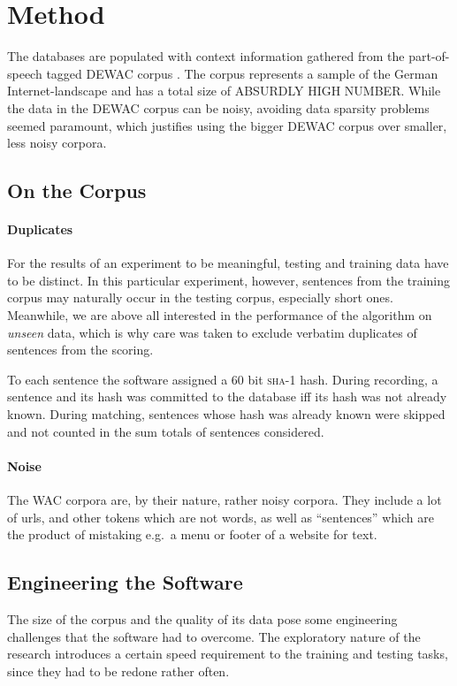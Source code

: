 \documentclass[12pt]{article}
\begin{document}
\section{Method}

The databases are populated with context information gathered from the
part-of-speech tagged DEWAC corpus \citep{baroniETAL2008}. The corpus represents
a sample of the German Internet-landscape and has a total size of ABSURDLY HIGH
NUMBER. %
While the data in the DEWAC corpus can be noisy, avoiding data sparsity
problems seemed paramount, which justifies using the bigger DEWAC
corpus over smaller, less noisy corpora.

\subsection{On the Corpus}

\paragraph{Duplicates} For the results of an experiment to be meaningful,
testing and training data have to be distinct. In this particular experiment,
however, sentences from the training corpus may naturally occur in the testing
corpus, especially short ones. %
Meanwhile, we are above all interested in the performance of
the algorithm on \emph{unseen} data, which is why care was taken to exclude
verbatim duplicates of sentences from the scoring.

To each sentence the software assigned a 60 bit \textsc{sha-1} hash. During
recording, a sentence and its hash was committed to the database iff its hash
was not already known. During matching, sentences whose hash was already known
were skipped and not counted in the sum totals of sentences considered.

\paragraph{Noise} The WAC corpora are, by their nature, rather noisy corpora.
They include a lot of urls, and other tokens which are not words, as well as
``sentences'' which are the product of mistaking e.g.\ a menu or footer of a
website for text.

\subsection{Engineering the Software}
The size of the corpus and the quality of its data pose some engineering
challenges that the software had to overcome. The exploratory nature of the
research introduces a certain speed requirement to the training and testing
tasks, since they had to be redone rather often.
\end{document}
